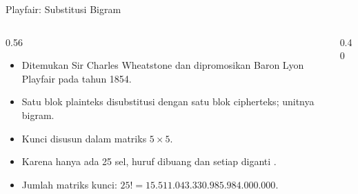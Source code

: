 \documentclass[aspectratio=169,11pt]{beamer}
\begin{document}
\begin{frame}{Playfair: Substitusi Bigram}
    \begin{columns}[T,onlytextwidth]
        \begin{column}{0.56\textwidth}
            \footnotesize
            \begin{itemize}
                \item Ditemukan Sir Charles Wheatstone dan dipromosikan Baron
                      Lyon Playfair pada tahun 1854.
                \item Satu blok plainteks disubstitusi dengan satu blok
                      cipherteks; unitnya bigram.
                \item Kunci disusun dalam matriks $5\times5$.
                \item Karena hanya ada 25 sel, huruf  dibuang dan
                      setiap  diganti .
                \item Jumlah matriks kunci:
                      $25!=15.511.043.330.985.984.000.000$.
            \end{itemize}
        \end{column}
        \begin{column}{0.40\textwidth}
            \centering
        \end{column}
    \end{columns}
\end{frame}
\end{document}
